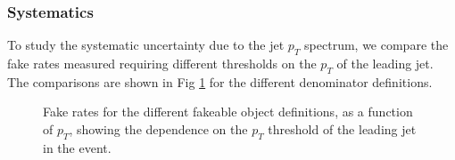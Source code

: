 \subsubsection{Systematics}
To study the systematic uncertainty due to the jet $p_{T}$ spectrum, we compare the fake rates
measured requiring different thresholds on the $p_{T}$ of the leading jet. The comparisons
are shown in Fig \ref{fig:ele_fr_jetPtThresholdDependence} for the different denominator definitions. 


\begin{figure}[!htbp]
\begin{center}
\caption{Fake rates for the different fakeable object definitions, as a function of $p_T$, showing
the dependence on the $p_{T}$ threshold of the leading jet in the event.}
\label{fig:ele_fr_jetPtThresholdDependence}
\end{center}
\end{figure}

